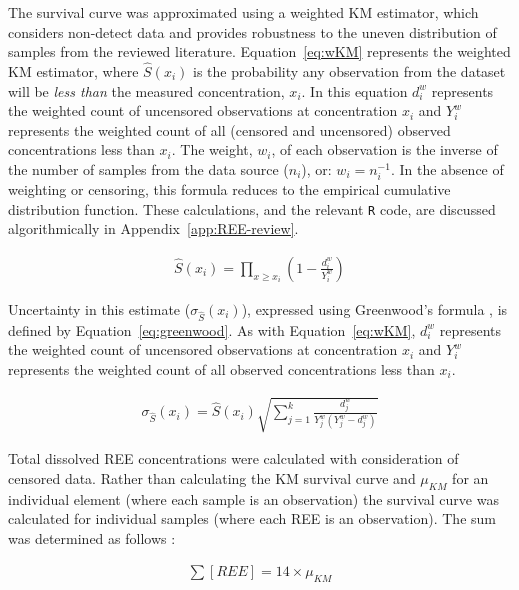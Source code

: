The survival curve was approximated using a weighted KM estimator, which considers non-detect data and provides robustness to the uneven distribution of samples from the reviewed literature.
Equation~\ref{eq:wKM} represents the weighted KM estimator, where $\hat{S}(x_i)$ is the probability any observation from the dataset will be \textit{less than} the measured concentration, $x_i$.
In this equation $d_i^w$ represents the weighted count of uncensored observations at concentration $x_i$ and $Y_i^w$ represents the weighted count of all (censored and uncensored) observed concentrations less than $x_i$.
The weight, $w_i$, of each observation is the inverse of the number of samples from the data source ($n_i$), or: $w_i = n_i^{-1}$.
In the absence of weighting or censoring, this formula reduces to the empirical cumulative distribution function.
These calculations, and the relevant \texttt{R} code, are discussed algorithmically in Appendix~\ref{app:REE-review}.

\begin{align}\label{eq:wKM}
\hat{S}(x_i) = \prod_{x \geq x_i}\left(1 - \frac{d_i^w}{Y_i^w} \right)
\end{align}

Uncertainty in this estimate ($\sigma_{\hat{S}}(x_i)$), expressed using Greenwood's formula \citep{Helsel_book}, is defined by Equation~\ref{eq:greenwood}. As with Equation~\ref{eq:wKM}, $d_i^w$ represents the weighted count of uncensored observations at concentration $x_i$ and $Y_i^w$ represents the weighted count of all observed concentrations less than $x_i$.

\begin{align}\label{eq:greenwood}
\sigma_{\hat{S}}(x_i) = \hat{S}(x_i)\sqrt{\sum_{j=1}^k\frac{d_j^w}{Y_j^w (Y_j^w - d_j^w)}}
\end{align}

Total dissolved REE concentrations were calculated with consideration of censored data.
Rather than calculating the KM survival curve and $\mu_{KM}$ for an individual element (where each sample is an observation) the survival curve was calculated for individual samples (where each REE is an observation).
The sum was determined as follows \citep{Helsel_book}:

\begin{align}\label{eq:totalREE}
\sum [REE] = 14\times \mu_{KM}
\end{align}


